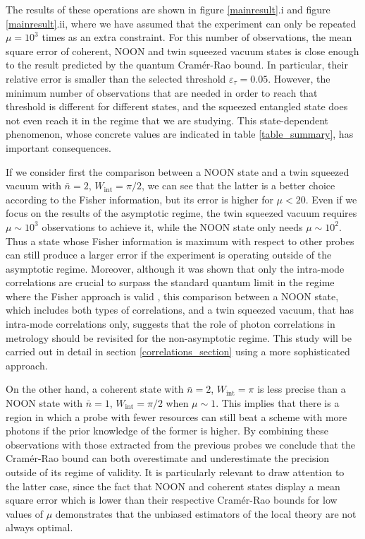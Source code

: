The results of these operations are shown in figure \ref{mainresult}.i and figure \ref{mainresult}.ii, where we have assumed that the experiment can only be repeated $\mu = 10^3$ times as an extra constraint. For this number of observations, the mean square error of coherent, NOON and twin squeezed vacuum states is close enough to the result predicted by the quantum Cram\'{e}r-Rao bound. In particular, their relative error is smaller than the selected threshold $\varepsilon_\tau = 0.05$. However, the minimum number of observations that are needed in order to reach that threshold is different for different states, and the squeezed entangled state does not even reach it in the regime that we are studying. This state-dependent phenomenon, whose concrete values are indicated in table \ref{table_summary}, has important consequences. 

If we consider first the comparison between a NOON state and a twin squeezed vacuum with $\bar{n} = 2$, $W_{\mathrm{int}} = \pi/2$, we can see that the latter is a better choice according to the Fisher information, but its error is higher for $\mu < 20$. Even if we focus on the results of the asymptotic regime, the twin squeezed vacuum requires $\mu \sim 10^3$ observations to achieve it, while the NOON state only needs $\mu \sim 10^2$. Thus a state whose Fisher information is maximum with respect to other probes can still produce a larger error if the experiment is operating outside of the asymptotic regime. Moreover, although it was shown that only the intra-mode correlations are crucial to surpass the standard quantum limit in the regime where the Fisher approach is valid \cite{sahota2015, sahota2016, proctor2017networked}, this comparison between a NOON state, which includes both types of correlations, and a twin squeezed vacuum, that has intra-mode correlations only, suggests that the role of photon correlations in metrology should be revisited for the non-asymptotic regime. This study will be carried out in detail in section \ref{correlations_section} using a more sophisticated approach.

On the other hand, a coherent state with $\bar{n} = 2$, $W_{\mathrm{int}} = \pi$ is less precise than a NOON state with $\bar{n} = 1$, $W_{\mathrm{int}} = \pi/2$ when $\mu \sim 1$. This implies that there is a region in which a probe with fewer resources can still beat a scheme with more photons if the prior knowledge of the former is higher. By combining these observations with those extracted from the previous probes we conclude that the Cram\'{e}r-Rao bound can both overestimate and underestimate the precision outside of its regime of validity. It is particularly relevant to draw attention to the latter case, since the fact that NOON and coherent states display a mean square error which is lower than their respective Cram\'{e}r-Rao bounds for low values of $\mu$ demonstrates that the unbiased estimators of the local theory are not always optimal.

